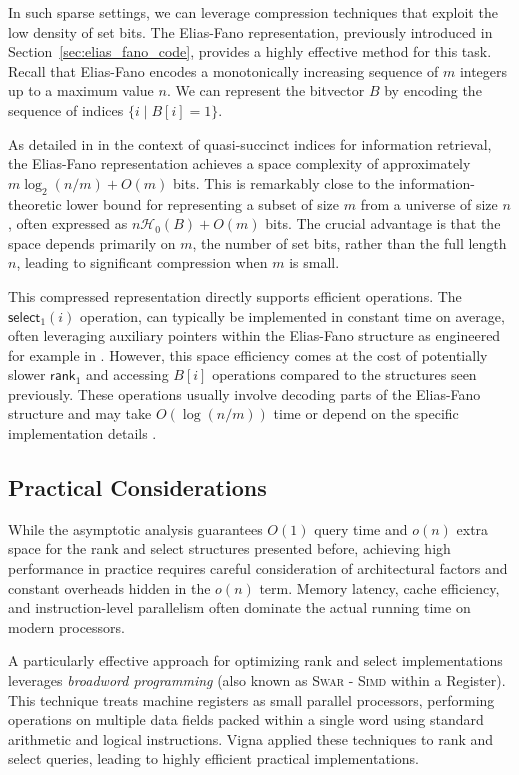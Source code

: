 In such sparse settings, we can leverage compression techniques that exploit the low density of set bits. The Elias-Fano representation, previously introduced in Section~\ref{sec:elias_fano_code}, provides a highly effective method for this task. Recall that Elias-Fano encodes a monotonically increasing sequence of $m$ integers up to a maximum value $n$. We can represent the bitvector $B$ by encoding the sequence of indices $\{ i \mid B[i]=1 \}$.

As detailed in \cite{vigna2013quasi} in the context of quasi-succinct indices for information retrieval, the Elias-Fano representation achieves a space complexity of approximately $m \log_2(n/m) + O(m)$ bits. This is remarkably close to the information-theoretic lower bound for representing a subset of size $m$ from a universe of size $n$, often expressed as $n\mathcal{H}_0(B) + O(m)$ bits. The crucial advantage is that the space depends primarily on $m$, the number of set bits, rather than the full length $n$, leading to significant compression when $m$ is small.

This compressed representation directly supports efficient operations. The $\textsf{select}_1(i)$ operation, can typically be implemented in constant time on average, often leveraging auxiliary pointers within the Elias-Fano structure as engineered for example in \cite{vigna2013quasi}. However, this space efficiency comes at the cost of potentially slower $\textsf{rank}_1$ and accessing $B[i]$ operations compared to the structures seen previously. These operations usually involve decoding parts of the Elias-Fano structure and may take $O(\log(n/m))$ time or depend on the specific implementation details \cite{navarro2016compact}.

\subsection{Practical Considerations} \label{subsec:practical_considerations}

While the asymptotic analysis guarantees $O(1)$ query time and $o(n)$ extra space for the \textsf{rank} and \textsf{select} structures presented before, achieving high performance in practice requires careful consideration of architectural factors and constant overheads hidden in the $o(n)$ term. Memory latency, cache efficiency, and instruction-level parallelism often dominate the actual running time on modern processors.

A particularly effective approach for optimizing \textsf{rank} and \textsf{select} implementations leverages \emph{broadword programming} (also known as \textsc{Swar} - \textsc{Simd} within a Register). This technique treats machine registers as small parallel processors, performing operations on multiple data fields packed within a single word using standard arithmetic and logical instructions. Vigna \cite{vigna2008broadword} applied these techniques to \textsf{rank} and \textsf{select} queries, leading to highly efficient practical implementations.

